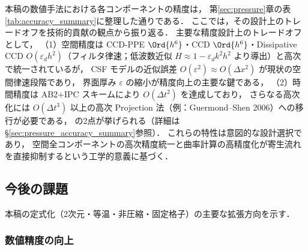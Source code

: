 本稿の数値手法における各コンポーネントの精度は，
第\ref{sec:pressure}章の表\ref{tab:accuracy_summary}に整理した通りである．
ここでは，その設計上のトレードオフを技術的貢献の観点から振り返る．
主要な精度設計上のトレードオフとして，
（1）空間精度は CCD-PPE $\Ord{h^6}$・CCD $\Ord{h^6}$・Dissipative CCD $O(\varepsilon_d h^2)$（フィルタ律速；低波数近似 $H\approx1-\varepsilon_d k^2h^2$ より導出）と高次で統一されているが，
CSF モデルの近似誤差 $O(\varepsilon^2) \approx O(\Delta x^2)$ が現状の空間律速段階であり，
界面厚み $\varepsilon$ の縮小が精度向上の主要な鍵である，
（2）時間精度は AB2+IPC スキームにより $O(\Delta t^2)$ を達成しており，
さらなる高次化には $O(\Delta t^3)$ 以上の高次 Projection 法（例：Guermond--Shen 2006）への移行が必要である，
の2点が挙げられる（詳細は§\ref{sec:pressure_accuracy_summary}参照）．
これらの特性は意図的な設計選択であり，
空間全コンポーネントの高次精度統一と曲率計算の高精度化が寄生流れを直接抑制するという工学的意義に基づく．

\subsection{今後の課題}
\label{sec:future_work}

本稿の定式化（2次元・等温・非圧縮・固定格子）の主要な拡張方向を示す．

\subsubsection{数値精度の向上}

